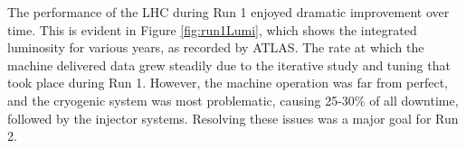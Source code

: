 The performance of the LHC during Run 1 enjoyed dramatic improvement over time.
This is evident in Figure \ref{fig:run1Lumi}, which shows the integrated luminosity for various years, as recorded by ATLAS.
The rate at which the machine delivered data grew steadily due to the iterative study and tuning that took place during Run 1.
However, the machine operation was far from perfect, and the cryogenic system was most problematic, causing 25-30\% of all downtime, followed by the injector systems.
Resolving these issues was a major goal for Run 2. \cite{lhcRun1}


